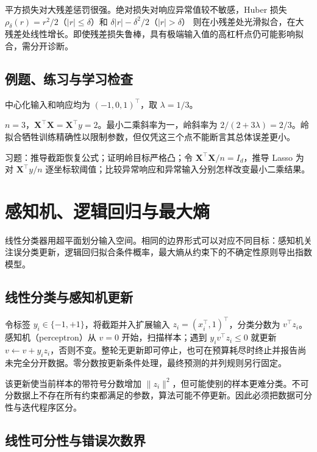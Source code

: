\documentclass[UTF8,12pt,a4paper,fontset=fandol]{ctexbook}
\begin{document}
平方损失对大残差惩罚很强。绝对损失对响应异常值较不敏感，Huber 损失
$\rho_\delta(r)=r^2/2$（$|r|\leq\delta$）和
$\delta|r|-\delta^2/2$（$|r|>\delta$）
则在小残差处光滑拟合，在大残差处线性增长。即使残差损失鲁棒，具有极端输入值的高杠杆点仍可能影响拟合，需分开诊断。

\section{例题、练习与学习检查}

\begin{example}[一维岭收缩]
中心化输入和响应均为 $(-1,0,1)^\top$，取 $\lambda=1/3$。
\end{example}
\begin{solve}
$n=3$，$\mathbf X^\top\mathbf X=\mathbf X^\top y=2$。最小二乘斜率为一，岭斜率为 $2/(2+3\lambda)=2/3$。岭拟合牺牲训练精确性以限制参数，但仅凭这三个点不能断言其总体误差更小。
\end{solve}

习题：推导截距恢复公式；证明岭目标严格凸；令 $\mathbf X^\top\mathbf X/n=I_d$，推导 Lasso 为对 $\mathbf X^\top y/n$ 逐坐标软阈值；比较异常响应和异常输入分别怎样改变最小二乘结果。

\chapter{感知机、逻辑回归与最大熵}
\label{chap:ml-logistic}

线性分类器用超平面划分输入空间。相同的边界形式可以对应不同目标：感知机关注误分类更新，逻辑回归拟合条件概率，最大熵从约束下的不确定性原则导出指数模型。

\section{线性分类与感知机更新}

令标签 $y_i\in\{-1,+1\}$，将截距并入扩展输入 $z_i=(x_i^\top,1)^\top$，分类分数为 $v^\top z_i$。感知机（perceptron）从 $v=0$ 开始，扫描样本；遇到 $y_iv^\top z_i\leq0$ 就更新 $v\leftarrow v+y_iz_i$，否则不变。整轮无更新即可停止，也可在预算耗尽时终止并报告尚未完全分开数据。零分数按更新条件处理，最终预测的并列规则另行固定。

该更新使当前样本的带符号分数增加 $\|z_i\|^2$，但可能使别的样本更难分类。不可分数据上不存在所有约束都满足的参数，算法可能不停更新。因此必须把数据可分性与迭代程序区分。

\section{线性可分性与错误次数界}
\end{document}
